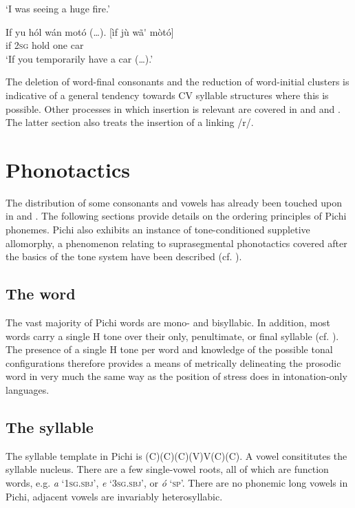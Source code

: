 \glt ‘I was seeing a huge fire.’\index{}
\z


\ea%
    \label{ex:key:40}
    \gll   If  yu  hól    wán    motó  (…).      [ìf  jù    wã\'{}   mòtó]\\
if  \textsc{2sg}  hold    one    car\\

\glt ‘If you temporarily have a car (…).’
\z

The deletion of word-final consonants and the reduction of word-initial clusters is indicative of a general tendency towards CV syllable structures where this is possible. Other processes in which insertion is relevant are covered in  and  and . The latter section also treats the insertion of a linking /r/.

\section{Phonotactics}\label{sec:2.6}

The distribution of some consonants and vowels has already been touched upon in  and . The following sections provide details on the ordering principles of Pichi phonemes. Pichi also exhibits an instance of tone-conditioned suppletive allomorphy, a phenomenon relating to suprasegmental phonotactics covered after the basics of the tone system have been described (cf. ).

\subsection{The word}\label{sec:2.6.1}

The vast majority of Pichi words are mono- and bisyllabic. In addition, most words carry a single H tone over their only, penultimate, or final syllable (cf. ). The presence of a single H tone per word and knowledge of the possible tonal configurations therefore provides a means of metrically delineating the prosodic word in very much the same way as the position of stress does in intonation-only languages.

\subsection{The syllable}\label{sec:2.6.2}

The syllable template in Pichi is (C)(C)(C)(V)V(C)(C). A vowel consititutes the syllable nucleus. There are a few single-vowel roots, all of which are function words, e.g. \textit{a} ‘\textsc{1sg.sbj}’, \textit{e} ‘\textsc{3sg.sbj}’, or \textit{ó} ‘\textsc{sp}’. There are no phonemic long vowels in Pichi, adjacent vowels are invariably heterosyllabic. 


